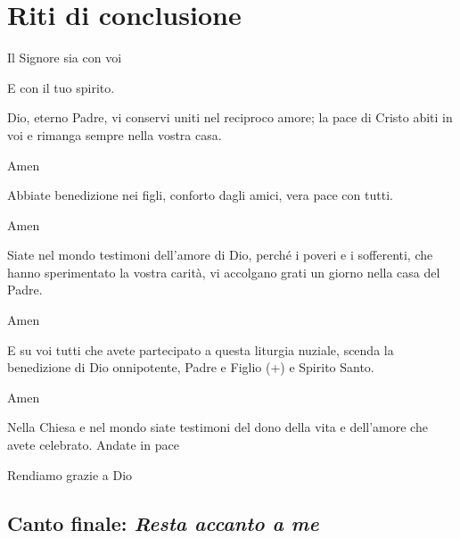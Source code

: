 
\section*{Riti di conclusione}

	\begin{dialoghi}
		\item[\sacerdote] Il Signore sia con voi
		\item[\assemblea] E con il tuo spirito.
		\item[\sacerdote] Dio, eterno Padre, vi conservi uniti nel reciproco amore; la pace di Cristo abiti in voi e rimanga sempre nella vostra casa.
		\item[\assemblea] Amen
		\item[\sacerdote] Abbiate benedizione nei figli, conforto dagli amici, vera pace con tutti.
		\item[\assemblea] Amen
		\item[\sacerdote] Siate nel mondo testimoni dell'amore di Dio, perché i poveri e i sofferenti, che hanno sperimentato la vostra carità, vi accolgano grati un giorno nella casa del Padre.
		\item[\assemblea] Amen
		\item[\sacerdote] E su voi tutti che avete partecipato a questa liturgia nuziale, scenda la benedizione di Dio onnipotente, Padre e Figlio (+) e Spirito Santo.
		\item[\assemblea] Amen
		\item[\sacerdote] Nella Chiesa e nel mondo siate testimoni del dono della vita e dell'amore che avete celebrato. Andate in pace
		\item[\assemblea] Rendiamo grazie a Dio
	\end{dialoghi}


\subsection*{Canto finale: \textit{Resta accanto a me}}

	\begin{mystrofe}
	\end{mystrofe}

